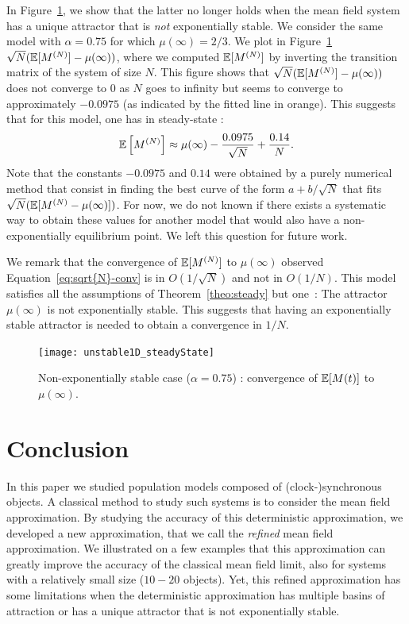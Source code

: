 \documentclass[review]{elsarticle}
\begin{document}
In Figure~\ref{fig:unstable_steadyState}, we show that the latter no longer
holds when the mean field system has a unique attractor that is {\em not}
exponentially stable. We consider the same model with $\alpha=0.75$
for which $\mu(\infty)=2/3$. We plot in
Figure~\ref{fig:unstable_steadyState}
$\sqrt{N}(\esp{\MN}-\mu(\infty))$, where we computed $\esp{\MN}$ by
inverting the transition matrix of the system of size $N$. This figure
shows that $\sqrt{N}(\esp{\MN}-\mu(\infty))$ does not converge to $0$
as $N$ goes to infinity but seems to converge to approximately
$-0.0975$ (as indicated by the fitted line in orange). This suggests
that for this model, one has in steady-state :
\begin{align}
  \esp{\MN}\approx\mu(\infty)-\frac{0.0975}{\sqrt{N}}+\frac{0.14}{N}.
  \label{eq:sqrt{N}-conv}
\end{align}
Note that the constants $-0.0975$ and $0.14$ were obtained by a purely
numerical method that consist in finding the best curve of the form
$a+b/\sqrt{N}$ that fits $\sqrt{N}(\esp{\MN-\mu(\infty)})$. For now,
we do not known if there exists a systematic way to obtain these
values for another model that would also have a non-exponentially
equilibrium point. We left this question for future work. 


We remark that the convergence of $\esp{\MN}$ to $\mu(\infty)$
observed Equation~\eqref{eq:sqrt{N}-conv} is in $O(1/\sqrt{N})$ and
not in $O(1/N)$. This model satisfies all the assumptions of
Theorem~\ref{theo:steady} but one~: The attractor $\mu(\infty)$ is not
exponentially stable. This suggests that having an exponentially
stable attractor is needed to obtain a convergence in $1/N$.  

\begin{figure}[ht]
  \centering
  \texttt{[image: unstable1D\_steadyState]}
  
  \caption{Non-exponentially stable case ($\alpha=0.75$) : convergence
    of $\esp{M(t)}$ to $\mu(\infty)$. }
  \label{fig:unstable_steadyState}
\end{figure}


\section{Conclusion}
\label{sec:conclusion}

In this paper we studied population models composed of
(clock-)synchronous objects. A classical method to study such systems
is to consider the mean field approximation. By studying the accuracy
of this deterministic approximation, we developed a new approximation,
that we call the \emph{refined} mean field approximation. We
illustrated on a few examples that this approximation can greatly
improve the accuracy of the classical mean field limit, also for
systems with a relatively small size ($10-20$ objects). Yet, this
refined approximation has some limitations when the deterministic
approximation has multiple basins of attraction or has a unique
attractor that is not exponentially stable.
\end{document}
